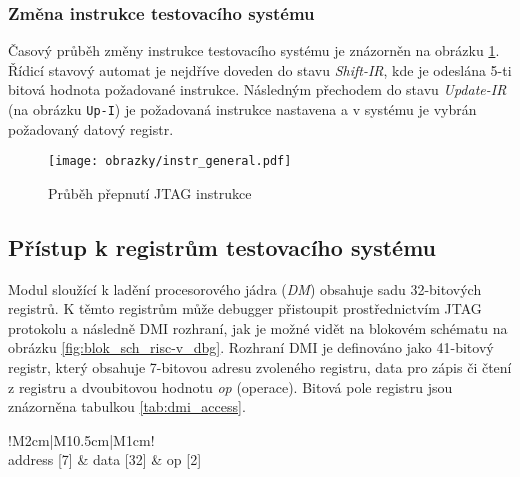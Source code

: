 \subsubsection{Změna instrukce testovacího systému}
Časový průběh změny instrukce testovacího systému je znázorněn na obrázku \ref{fig:jtag_instr}. Řídicí stavový automat je nejdříve doveden do stavu \textit{Shift-IR}, kde je odeslána 5-ti bitová hodnota požadované instrukce. Následným přechodem do stavu \textit{Update-IR} (na obrázku \texttt{Up-I}) je požadovaná instrukce nastavena a v systému je vybrán požadovaný datový registr. 

\begin{figure}[!h]
  \begin{center}
    \texttt{[image: obrazky/instr\_general.pdf]}
  \end{center}
  \caption{Průběh přepnutí \acs{JTAG} instrukce}
	\label{fig:jtag_instr}
\end{figure}

\subsection{Přístup k registrům testovacího systému}		\label{subsec:dm_reg_access}
Modul sloužící k ladění procesorového jádra (\textit{\acl{DM}}) obsahuje sadu 32-bitových registrů. K těmto registrům může debugger přistoupit prostřednictvím \acs{JTAG} protokolu a následně \acs{DMI} rozhraní, jak je možné vidět na blokovém schématu na obrázku \ref{fig:blok_sch_risc-v_dbg}. Rozhraní \acs{DMI} je definováno jako 41-bitový registr, který obsahuje 7-bitovou adresu zvoleného registru, data pro zápis či čtení z registru a dvoubitovou hodnotu \textit{op} (operace). Bitová pole registru jsou znázorněna tabulkou \ref{tab:dmi_access}. \cite{risc-v_dbg}

\begin{table}[H]
  \caption{Formát registru pro přístup k registrům testovacího systému \cite{risc-v_dbg}}
  \begin{center}
  	\small
	  \begin{tabular}{!{\vrule width 1.2pt}M{2cm}|M{10.5cm}|M{1cm}!{\vrule width 1.2pt}}
				\\
				\hline
				address [7] & data [32] & op [2]\\
				\hline
		\end{tabular}
  \end{center}
	\label{tab:dmi_access}
\end{table}

